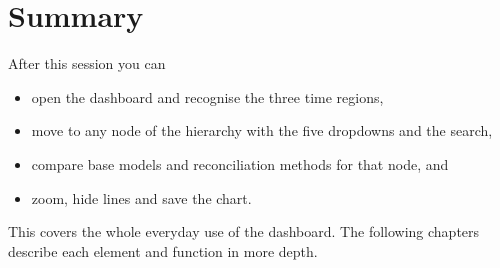 %
%
%
%

\section{Summary}

After this session you can
\begin{itemize}
  \item open the dashboard and recognise the three time regions,
  \item move to any node of the hierarchy with the five dropdowns and the search,
  \item compare base models and reconciliation methods for that node, and
  \item zoom, hide lines and save the chart.
\end{itemize}
This covers the whole everyday use of the dashboard. The following chapters describe each element and function in more depth.

